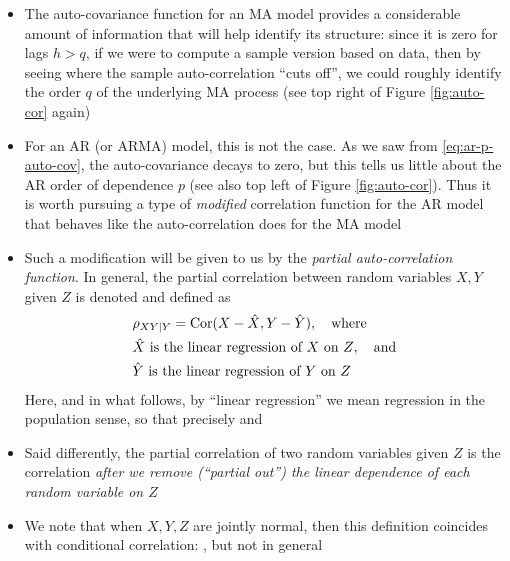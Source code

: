 \documentclass{article}
\begin{document}
\begin{itemize}
\item The auto-covariance function for an MA model provides a considerable
  amount of information that will help identify its structure: since it is zero
  for lags $h>q$, if we were to compute a sample version based on data, then by
  seeing where the sample auto-correlation ``cuts off'', we could roughly
  identify the order $q$ of the underlying MA process (see top right of Figure 
  \ref{fig:auto-cor} again)   

\item For an AR (or ARMA) model, this is not the case. As we saw from
  \eqref{eq:ar-p-auto-cov}, the auto-covariance decays to zero, but this tells
  us little about the AR order of dependence $p$ (see also top left of Figure 
  \ref{fig:auto-cor}). Thus it is worth pursuing a type of \emph{modified}
  correlation function for the AR model that behaves like the auto-correlation
  does for the MA model 

\item Such a modification will be given to us by the \emph{partial
    auto-correlation function}. In general, the partial correlation between
  random variables $X,Y$ given $Z$ is denoted  and defined
  as    
  \begin{align*}
  &\rho_{XY|Y} = \operatorname{Cor}(X - \hat{X}, Y - \hat{Y}), \quad \text{where} \\
  &\text{$\hat{X}$ is the linear regression of $X$ on $Z$}, \quad \text{and} \\
  &\text{$\hat{Y}$ is the linear regression of $Y$ on $Z$}
  \end{align*}
  Here, and in what follows, by ``linear regression'' we mean regression in the
  population sense, so that precisely  and    

\item Said differently, the partial correlation of two random variables given
  $Z$ is the correlation \emph{after we remove (``partial out'') the linear
    dependence of each random variable on $Z$}     

\item We note that when $X,Y,Z$ are jointly normal, then this definition
  coincides with conditional correlation: ,
  but not in general 


\end{itemize}
\end{document}
